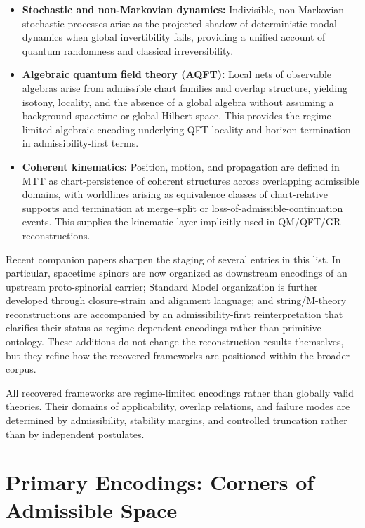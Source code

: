 \documentclass[11pt]{article}
\begin{document}
\begin{itemize}
\item \textbf{Stochastic and non-Markovian dynamics:}
Indivisible, non-Markovian stochastic processes arise as the projected shadow of
deterministic modal dynamics when global invertibility fails, providing a unified account
of quantum randomness and classical irreversibility.

\item \textbf{Algebraic quantum field theory (AQFT):} Local nets of observable algebras arise from
admissible chart families and overlap structure, yielding isotony, locality, and the absence
of a global algebra without assuming a background spacetime or global Hilbert space.
This provides the regime-limited algebraic encoding underlying QFT locality and horizon
termination in admissibility-first terms.

\item \textbf{Coherent kinematics:} Position, motion, and propagation are defined in MTT as chart-persistence
of coherent structures across overlapping admissible domains, with worldlines arising as equivalence
classes of chart-relative supports and termination at merge–split or loss-of-admissible-continuation
events. This supplies the kinematic layer implicitly used in QM/QFT/GR reconstructions.

\end{itemize}

Recent companion papers sharpen the staging of several entries in this list. In particular,
spacetime spinors are now organized as downstream encodings of an upstream proto-spinorial
carrier; Standard Model organization is further developed through closure-strain and alignment
language; and string/M-theory reconstructions are accompanied by an admissibility-first
reinterpretation that clarifies their status as regime-dependent encodings rather than primitive
ontology. These additions do not change the reconstruction results themselves, but they refine
how the recovered frameworks are positioned within the broader corpus.

All recovered frameworks are regime-limited encodings rather than globally valid theories.
Their domains of applicability, overlap relations, and failure modes are determined by
admissibility, stability margins, and controlled truncation rather than by independent
postulates.


\section{Primary Encodings: Corners of Admissible Space}
\end{document}
